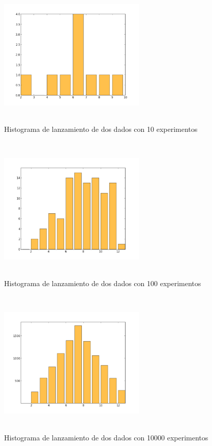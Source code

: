 \documentclass{article}
\begin{document}
\begin{figure}
\centering
\includegraphics[width=7cm, height=7cm]{hist1.png}
\caption{Histograma de lanzamiento de dos dados con 10 experimentos}
\label{fig:my_label}
\end{figure}
\begin{figure}
\centering
\includegraphics[width=7cm, height=7cm]{hist2.png}
\caption{Histograma de lanzamiento de dos dados con 100 experimentos}
\label{fig:my_label}
\end{figure}
\begin{figure}
\centering
\includegraphics[width=7cm, height=7cm]{hist3.png}
\caption{Histograma de lanzamiento de dos dados con 10000 experimentos}
\label{fig:my_label}
\end{figure}
\end{document}

